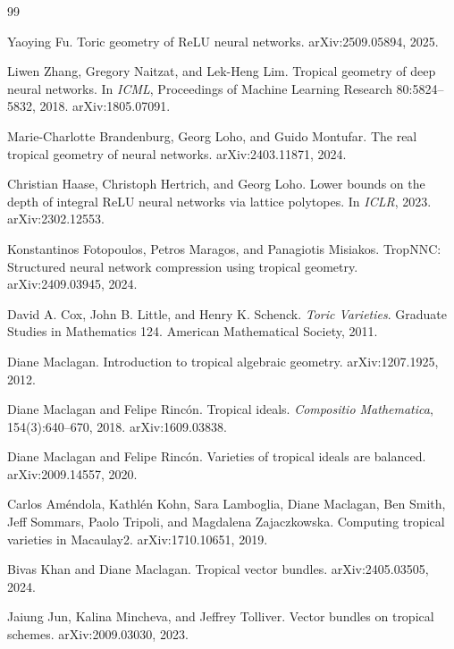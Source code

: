\documentclass[11pt]{article}
\theoremstyle{definition}
\theoremstyle{plain}
\theoremstyle{remark}
\numberwithin{equation}{section}
\begin{document}
\begin{thebibliography}{99}

Yaoying Fu.
\newblock Toric geometry of ReLU neural networks.
\newblock arXiv:2509.05894, 2025.

Liwen Zhang, Gregory Naitzat, and Lek-Heng Lim.
\newblock Tropical geometry of deep neural networks.
\newblock In \emph{ICML}, Proceedings of Machine Learning Research 80:5824--5832, 2018. arXiv:1805.07091.

Marie-Charlotte Brandenburg, Georg Loho, and Guido Montufar.
\newblock The real tropical geometry of neural networks.
\newblock arXiv:2403.11871, 2024.

Christian Haase, Christoph Hertrich, and Georg Loho.
\newblock Lower bounds on the depth of integral ReLU neural networks via lattice polytopes.
\newblock In \emph{ICLR}, 2023. arXiv:2302.12553.

Konstantinos Fotopoulos, Petros Maragos, and Panagiotis Misiakos.
\newblock TropNNC: Structured neural network compression using tropical geometry.
\newblock arXiv:2409.03945, 2024.

David A. Cox, John B. Little, and Henry K. Schenck.
\newblock \emph{Toric Varieties}.
\newblock Graduate Studies in Mathematics 124. American Mathematical Society, 2011.

Diane Maclagan.
\newblock Introduction to tropical algebraic geometry.
\newblock arXiv:1207.1925, 2012.

Diane Maclagan and Felipe Rinc\'on.
\newblock Tropical ideals.
\newblock \emph{Compositio Mathematica}, 154(3):640--670, 2018. arXiv:1609.03838.

Diane Maclagan and Felipe Rinc\'on.
\newblock Varieties of tropical ideals are balanced.
\newblock arXiv:2009.14557, 2020.

Carlos Am\'endola, Kathl\'en Kohn, Sara Lamboglia, Diane Maclagan, Ben Smith, Jeff Sommars, Paolo Tripoli, and Magdalena Zajaczkowska.
\newblock Computing tropical varieties in Macaulay2.
\newblock arXiv:1710.10651, 2019.

Bivas Khan and Diane Maclagan.
\newblock Tropical vector bundles.
\newblock arXiv:2405.03505, 2024.

Jaiung Jun, Kalina Mincheva, and Jeffrey Tolliver.
\newblock Vector bundles on tropical schemes.
\newblock arXiv:2009.03030, 2023.


\end{thebibliography}
\end{document}
